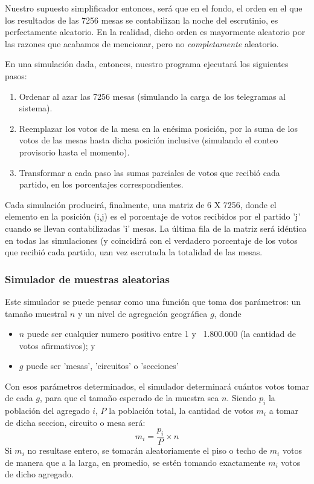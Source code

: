 \documentclass[12pt, a4paper]{article}
\begin{document}
Nuestro supuesto simplificador entonces, ser\'a que en el fondo, el orden en el que los resultados de las 7256 mesas se contabilizan la noche del escrutinio, es perfectamente aleatorio. En la realidad, dicho orden es mayormente aleatorio por las razones que acabamos de mencionar, pero no \emph{completamente} aleatorio.

En una simulaci\'on dada, entonces, nuestro programa ejecutar\'a los siguientes pasos:

\begin{enumerate}
	\item Ordenar al azar las 7256 mesas (simulando la carga de los telegramas al sistema).
	\item Reemplazar los votos de la mesa en la en\'esima posici\'on, por la suma de los votos de las mesas hasta dicha posici\'on inclusive (simulando el conteo provisorio hasta el momento).
	\item Transformar a cada paso las sumas parciales de votos que recibi\'o cada partido, en los porcentajes correspondientes.
\end{enumerate}

Cada simulaci\'on producir\'a, finalmente, una matriz de 6 X 7256, donde el elemento en la posici\'on (i,j) es el porcentaje de votos recibidos por el partido 'j' cuando se llevan contabilizadas 'i' mesas. La \'ultima fila de la matriz ser\'a id\'entica en todas las simulaciones (y coincidir\'a con el verdadero porcentaje de los votos que recibi\'o cada partido, uan vez escrutada la totalidad de las mesas.

\subsubsection{Simulador de muestras aleatorias}

Este simulador se puede pensar como una funci\'on que toma dos par\'ametros: un tama\~no muestral $n$ y un nivel de agregaci\'on geogr\'afica $g$, donde 

\begin{itemize}
	\item $n$ puede ser cualquier numero positivo entre 1 y ~1.800.000 (la cantidad de votos afirmativos); y
	\item $g$ puede ser 'mesas', 'circuitos' o 'secciones'
\end{itemize}

Con esos par\'ametros determinados, el simulador determinar\'a cu\'antos votos tomar de cada $g$, para que el tama\~no esperado de la muestra sea $n$. Siendo $p_{i}$ la poblaci\'on del agregado $i$, $P$ la poblaci\'on total, la cantidad de votos $m_{i}$ a tomar de dicha seccion, circuito o mesa ser\'a:
$$ m_{i} = \frac{p_{i}}{P} \times{} n $$
	Si $m_{i}$ no resultase entero, se tomar\'an aleatoriamente el piso o techo de $m_{i}$ votos de manera que a la larga, en promedio, se est\'en tomando exactamente $m_{i}$ votos de dicho agregado.
\end{document}

